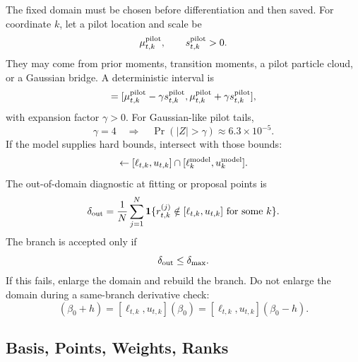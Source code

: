 \documentclass[11pt]{article}
\numberwithin{equation}{section}
\newcommand{\ind}{\mathbf 1}
\begin{document}
The fixed domain must be chosen before differentiation and then saved.  For
coordinate \(k\), let a pilot location and scale be
\begin{equation}
    \mu_{t,k}^{\rm pilot},
    \qquad
    s_{t,k}^{\rm pilot}>0.
    \label{eq:p24-p23-dom1}
\end{equation}
They may come from prior moments, transition moments, a pilot particle cloud,
or a Gaussian bridge.  A deterministic interval is
\begin{equation}
    [\ell_{t,k},u_{t,k}]
    =
    [\mu_{t,k}^{\rm pilot}-\gamma s_{t,k}^{\rm pilot},
     \mu_{t,k}^{\rm pilot}+\gamma s_{t,k}^{\rm pilot}],
    \label{eq:p24-p23-dom2}
\end{equation}
with expansion factor \(\gamma>0\).  For Gaussian-like pilot tails,
\begin{equation}
    \gamma=4
    \quad\Rightarrow\quad
    \Pr(|Z|>\gamma)\approx 6.3\times 10^{-5}.
    \label{eq:p24-p23-dom3}
\end{equation}
If the model supplies hard bounds, intersect with those bounds:
\begin{equation}
    [\ell_{t,k},u_{t,k}]
    \leftarrow
    [\ell_{t,k},u_{t,k}]
    \cap
    [\ell_{k}^{\rm model},u_{k}^{\rm model}].
    \label{eq:p24-p23-dom4}
\end{equation}
The out-of-domain diagnostic at fitting or proposal points is
\begin{equation}
    \delta_{\rm out}
    =
    \frac{1}{N}
    \sum_{j=1}^N
    \ind\{r_{t,k}^{(j)}\notin[\ell_{t,k},u_{t,k}]
    \text{ for some }k\}.
    \label{eq:p24-p23-dom5}
\end{equation}
The branch is accepted only if
\begin{equation}
    \delta_{\rm out}\le \delta_{\max}.
    \label{eq:p24-p23-dom6}
\end{equation}
If this fails, enlarge the domain and rebuild the branch.  Do not enlarge the
domain during a same-branch derivative check:
\begin{equation}
    [\ell_{t,k},u_{t,k}](\beta_0+h)
    =
    [\ell_{t,k},u_{t,k}](\beta_0)
    =
    [\ell_{t,k},u_{t,k}](\beta_0-h).
    \label{eq:p24-p23-dom7}
\end{equation}

\subsection{Basis, Points, Weights, Ranks}
\end{document}
